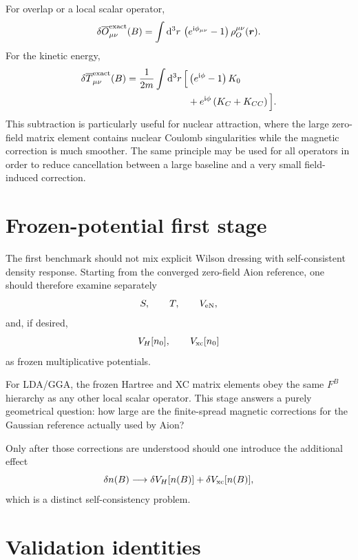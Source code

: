 \documentclass[11pt]{article}
\newcommand{\ii}{\mathrm{i}}
\newcommand{\dd}{\mathrm{d}}
\newcommand{\vect}[1]{\bm{#1}}
\begin{document}
For overlap or a local scalar operator,
\begin{equation}
\delta\overline O^{\rm exact}_{\mu\nu}(B)
=\int \dd^3r\,
\left(e^{\ii\phi_{\mu\nu}}-1\right)
\rho_O^{\mu\nu}(\vect r).
\label{eq:deltaO}
\end{equation}
For the kinetic energy,
\begin{align}
\delta\overline T^{\rm exact}_{\mu\nu}(B)
=\frac{1}{2m}\int \dd^3r\,\Big[
&\left(e^{\ii\phi}-1\right)K_0
\nonumber\\
&+e^{\ii\phi}\left(K_C+K_{CC}\right)
\Big].
\label{eq:deltaT}
\end{align}
This subtraction is particularly useful for nuclear attraction, where the large zero-field matrix element contains nuclear Coulomb singularities while the magnetic correction is much smoother.  The same principle may be used for all operators in order to reduce cancellation between a large baseline and a very small field-induced correction.

\section{Frozen-potential first stage}

The first benchmark should not mix explicit Wilson dressing with self-consistent density response.  Starting from the converged zero-field Aion reference, one should therefore examine separately
\begin{equation}
S,\qquad T,\qquad V_{\rm eN},
\end{equation}
and, if desired,
\begin{equation}
V_H[n_0],\qquad V_{\rm xc}[n_0]
\end{equation}
as frozen multiplicative potentials.

For LDA/GGA, the frozen Hartree and XC matrix elements obey the same $F^B$ hierarchy as any other local scalar operator.  This stage answers a purely geometrical question: how large are the finite-spread magnetic corrections for the Gaussian reference actually used by Aion?

Only after those corrections are understood should one introduce the additional effect
\begin{equation}
\delta n(B)\longrightarrow
\delta V_H[n(B)]+\delta V_{\rm xc}[n(B)],
\end{equation}
which is a distinct self-consistency problem.

\section{Validation identities}
\end{document}

